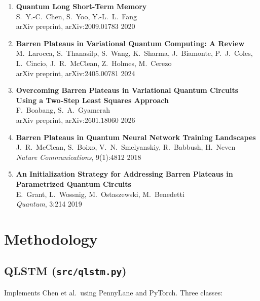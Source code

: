 \documentclass[11pt,a4paper]{article}
\begin{document}
\begin{enumerate}

  \item \textbf{Quantum Long Short-Term Memory}\\
  S.\ Y.-C.\ Chen, S.\ Yoo, Y.-L.\ L.\ Fang\\
  arXiv preprint, arXiv:2009.01783 \hfill 2020

  \item \textbf{Barren Plateaus in Variational Quantum Computing: A Review}\\
  M.\ Larocca, S.\ Thanasilp, S.\ Wang, K.\ Sharma, J.\ Biamonte, P.\ J.\ Coles, L.\ Cincio, J.\ R.\ McClean, Z.\ Holmes, M.\ Cerezo\\
  arXiv preprint, arXiv:2405.00781 \hfill 2024

  \item \textbf{Overcoming Barren Plateaus in Variational Quantum Circuits Using a Two-Step Least Squares Approach}\\
  F.\ Boabang, S.\ A.\ Gyamerah\\
  arXiv preprint, arXiv:2601.18060 \hfill 2026

  \item \textbf{Barren Plateaus in Quantum Neural Network Training Landscapes}\\
  J.\ R.\ McClean, S.\ Boixo, V.\ N.\ Smelyanskiy, R.\ Babbush, H.\ Neven\\
  \textit{Nature Communications}, 9(1):4812 \hfill 2018

  \item \textbf{An Initialization Strategy for Addressing Barren Plateaus in Parametrized Quantum Circuits}\\
  E.\ Grant, L.\ Wossnig, M.\ Ostaszewski, M.\ Benedetti\\
  \textit{Quantum}, 3:214 \hfill 2019

\end{enumerate}

\section{Methodology}

\subsection{QLSTM (\texttt{src/qlstm.py})}

Implements Chen et al.\ using PennyLane and PyTorch. Three classes:
\end{document}

